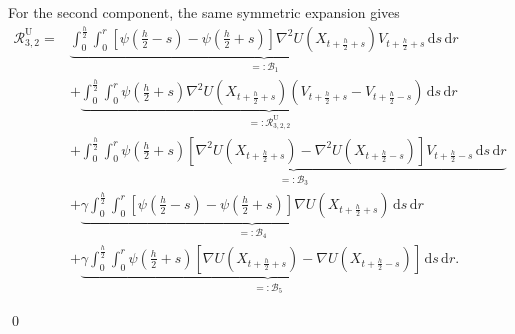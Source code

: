 \documentclass[12pt]{article}
\newenvironment{redtext}
  {\color{black}\ignorespaces}
  {\ignorespacesafterend}
\numberwithin{equation}{section}
\renewenvironment{proof}%
  {\begin{trivlist}%
   \item[]\ignorespaces}%
  {\qed\end{trivlist}}
\newcommand{\dd}{\mathrm{d}}
\begin{document}
\begin{redtext}
\begin{proof}
For the second component, the same symmetric expansion gives
\begin{align}
\mathcal R^{\mathrm{U}}_{3,2}
=&
\underbrace{
\int_0^{\frac h2}\int_0^r
\left[
\psi(\tfrac h2-s)-\psi(\tfrac h2+s)
\right]
\nabla^2U(X_{t+\frac h2+s})V_{t+\frac h2+s}\,\dd s\,\dd r
}_{=:\mathcal B_1}
\nonumber\\
&+
\underbrace{
\int_0^{\frac h2}\int_0^r
\psi(\tfrac h2+s)\nabla^2U(X_{t+\frac h2+s})
\left(V_{t+\frac h2+s}-V_{t+\frac h2-s}\right)\,\dd s\,\dd r
}_{=:\mathcal R^{\mathrm{U}}_{3,2,2}}
\nonumber\\
&+
\underbrace{
\int_0^{\frac h2}\int_0^r
\psi(\tfrac h2+s)
\left[
\nabla^2U(X_{t+\frac h2+s})-\nabla^2U(X_{t+\frac h2-s})
\right]V_{t+\frac h2-s}\,\dd s\,\dd r
}_{=:\mathcal B_3}
\nonumber\\
&+
\underbrace{
\gamma\int_0^{\frac h2}\int_0^r
\left[
\psi(\tfrac h2-s)-\psi(\tfrac h2+s)
\right]\nabla U(X_{t+\frac h2+s})\,\dd s\,\dd r
}_{=:\mathcal B_4}
\nonumber\\
&+
\underbrace{
\gamma\int_0^{\frac h2}\int_0^r
\psi(\tfrac h2+s)
\left[
\nabla U(X_{t+\frac h2+s})-\nabla U(X_{t+\frac h2-s})
\right]\,\dd s\,\dd r
}_{=:\mathcal B_5}.
\label{eq:R3-mid-second-decomp}
\end{align}


\end{proof}
\end{redtext}
\end{document}
